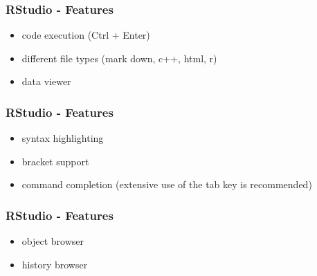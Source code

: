 \documentclass[xcolor={table}]{beamer}
\begin{document}
\begin{frame}\frametitle{RStudio - Features}
  \begin{itemize}
    \item code execution (Ctrl + Enter)
    \item different file types (mark down, c++, html, r)
    \item data viewer
  \end{itemize}
\begin{center}
\end{center}
\end{frame}

\begin{frame}\frametitle{RStudio - Features}
  \begin{itemize}
    \item syntax highlighting
    \item bracket support
    \item command completion (extensive use of the tab key is recommended)
  \end{itemize}
\begin{center}
\end{center}
\end{frame}


\begin{frame}\frametitle{RStudio - Features}
  \begin{itemize}
    \item object browser
    \item history browser
  \end{itemize}
\begin{center}
\end{center}
\end{frame}
\end{document}

